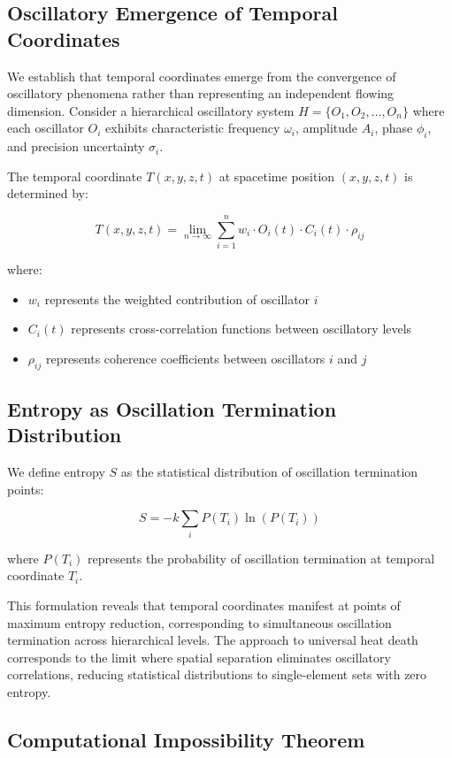 \documentclass[11pt]{article}
\theoremstyle{remark}
\begin{document}
\subsection{Oscillatory Emergence of Temporal Coordinates}

We establish that temporal coordinates emerge from the convergence of oscillatory phenomena rather than representing an independent flowing dimension. Consider a hierarchical oscillatory system $H = \{O_1, O_2, \ldots, O_n\}$ where each oscillator $O_i$ exhibits characteristic frequency $\omega_i$, amplitude $A_i$, phase $\phi_i$, and precision uncertainty $\sigma_i$.

The temporal coordinate $T(x,y,z,t)$ at spacetime position $(x,y,z,t)$ is determined by:

$$T(x,y,z,t) = \lim_{n \to \infty} \sum_{i=1}^{n} w_i \cdot O_i(t) \cdot C_i(t) \cdot \rho_{ij}$$

where:
\begin{itemize}
\item $w_i$ represents the weighted contribution of oscillator $i$
\item $C_i(t)$ represents cross-correlation functions between oscillatory levels
\item $\rho_{ij}$ represents coherence coefficients between oscillators $i$ and $j$
\end{itemize}

\subsection{Entropy as Oscillation Termination Distribution}

We define entropy $S$ as the statistical distribution of oscillation termination points:

$$S = -k \sum_i P(T_i) \ln(P(T_i))$$

where $P(T_i)$ represents the probability of oscillation termination at temporal coordinate $T_i$.

This formulation reveals that temporal coordinates manifest at points of maximum entropy reduction, corresponding to simultaneous oscillation termination across hierarchical levels. The approach to universal heat death corresponds to the limit where spatial separation eliminates oscillatory correlations, reducing statistical distributions to single-element sets with zero entropy.

\subsection{Computational Impossibility Theorem}
\end{document}
